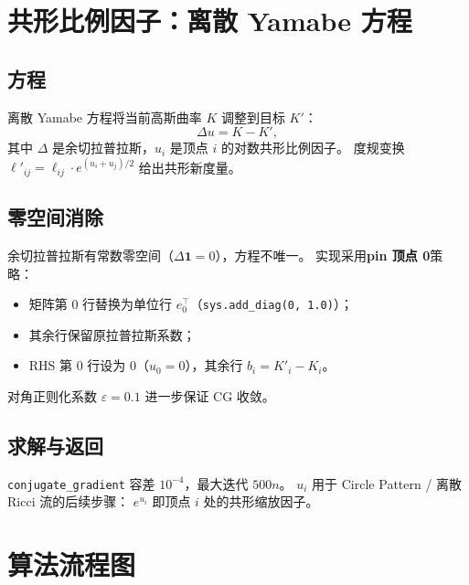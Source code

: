 \documentclass[11pt,a4paper]{article}
\begin{document}
\section{共形比例因子：离散 Yamabe 方程}

\subsection{方程}

离散 Yamabe 方程将当前高斯曲率 $K$ 调整到目标 $K'$：
\[
  \Delta u = K - K',
\]
其中 $\Delta$ 是余切拉普拉斯，$u_i$ 是顶点 $i$ 的对数共形比例因子。
度规变换 $\ell'_{ij} = \ell_{ij} \cdot e^{(u_i + u_j)/2}$ 给出共形新度量。

\subsection{零空间消除}

余切拉普拉斯有常数零空间（$\Delta \mathbf{1} = 0$），方程不唯一。
实现采用\textbf{pin 顶点 0}策略：
\begin{itemize}
  \item 矩阵第 0 行替换为单位行 $e_0^\top$（\texttt{sys.add\_diag(0, 1.0)}）；
  \item 其余行保留原拉普拉斯系数；
  \item RHS 第 0 行设为 $0$（$u_0 = 0$），其余行 $b_i = K'_i - K_i$。
\end{itemize}
对角正则化系数 $\varepsilon = 0.1$ 进一步保证 CG 收敛。

\subsection{求解与返回}

\texttt{conjugate\_gradient} 容差 $10^{-4}$，最大迭代 $500 n$。
$u_i$ 用于 Circle Pattern / 离散 Ricci 流的后续步骤：
$e^{u_i}$ 即顶点 $i$ 处的共形缩放因子。

\section{算法流程图}
\end{document}
